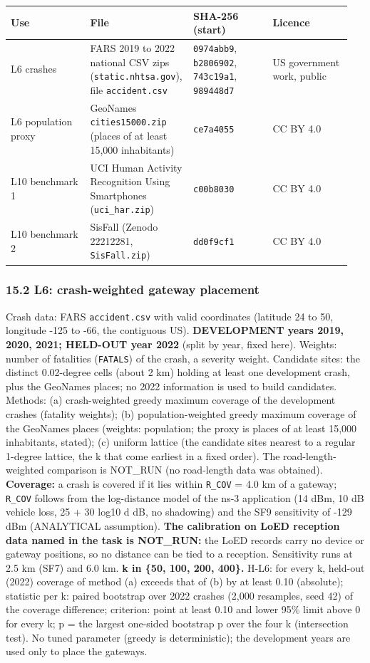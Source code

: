 {\scriptsize\raggedright
\begin{longtable}{p{0.237\linewidth}p{0.237\linewidth}p{0.237\linewidth}p{0.237\linewidth}}
\toprule
Use & File & SHA-256 (start) & Licence \\
\midrule
\endhead
L6 crashes & FARS 2019 to 2022 national CSV zips (\texttt{static.nhtsa.gov}), file \texttt{accident.csv} & \texttt{0974abb9}, \texttt{b2806902}, \texttt{743c19a1}, \texttt{989448d7} & US government work, public \\
L6 population proxy & GeoNames \texttt{cities15000.zip} (places of at least 15,000 inhabitants) & \texttt{ce7a4055} & CC BY 4.0 \\
L10 benchmark 1 & UCI Human Activity Recognition Using Smartphones (\texttt{uci\_har.zip}) & \texttt{c00b8030} & CC BY 4.0 \\
L10 benchmark 2 & SisFall (Zenodo 22212281, \texttt{SisFall.zip}) & \texttt{dd0f9cf1} & CC BY 4.0 \\
\bottomrule
\end{longtable}}

\subsubsection*{15.2 L6: crash-weighted gateway placement}

Crash data: FARS \texttt{accident.csv} with valid coordinates (latitude 24 to 50, longitude -125 to -66, the contiguous US). \textbf{DEVELOPMENT years 2019, 2020, 2021; HELD-OUT year 2022} (split by year, fixed here). Weights: number of fatalities (\texttt{FATALS}) of the crash, a severity weight. Candidate sites: the distinct 0.02-degree cells (about 2 km) holding at least one development crash, plus the GeoNames places; no 2022 information is used to build candidates. Methods: (a) crash-weighted greedy maximum coverage of the development crashes (fatality weights); (b) population-weighted greedy maximum coverage of the GeoNames places (weights: population; the proxy is places of at least 15,000 inhabitants, stated); (c) uniform lattice (the candidate sites nearest to a regular 1-degree lattice, the k that come earliest in a fixed order). The road-length-weighted comparison is NOT\_RUN (no road-length data was obtained). \textbf{Coverage:} a crash is covered if it lies within \texttt{R\_COV} = 4.0 km of a gateway; \texttt{R\_COV} follows from the log-distance model of the ns-3 application (14 dBm, 10 dB vehicle loss, 25 + 30 log10 d dB, no shadowing) and the SF9 sensitivity of -129 dBm (ANALYTICAL assumption). \textbf{The calibration on LoED reception data named in the task is NOT\_RUN:} the LoED records carry no device or gateway positions, so no distance can be tied to a reception. Sensitivity runs at 2.5 km (SF7) and 6.0 km. \textbf{k in \{50, 100, 200, 400\}.} H-L6: for every k, held-out (2022) coverage of method (a) exceeds that of (b) by at least 0.10 (absolute); statistic per k: paired bootstrap over 2022 crashes (2,000 resamples, seed 42) of the coverage difference; criterion: point at least 0.10 and lower 95\% limit above 0 for every k; p = the largest one-sided bootstrap p over the four k (intersection test). No tuned parameter (greedy is deterministic); the development years are used only to place the gateways.

